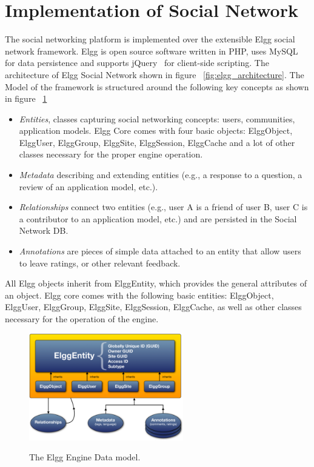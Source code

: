 \section{Implementation of Social Network}
\label{sec:implementaion_of_social_netowrk}
The social networking platform is implemented over the extensible Elgg social network framework\cite{elgg_url}.  Elgg is open source software written in PHP, uses MySQL for data persistence and supports jQuery~\cite{jquery_url} for client-side scripting.  The architecture of Elgg Social Network shown in figure ~\ref{fig:elgg_architecture}. The Model of the framework is structured around the following key concepts as shown in figure ~\ref{fig:elgg_entities}
\begin{itemize}
\item \emph{Entities}, classes capturing social networking concepts: users, communities, application models. Elgg Core comes with four basic objects: ElggObject, ElggUser, ElggGroup, ElggSite, ElggSession, ElggCache and a lot of other classes necessary for the proper engine operation.
\item \emph{Metadata} describing and extending entities (e.g., a response to a question, a review of an application model, etc.).
\item  \emph{Relationships} connect two entities (e.g., user A is a friend of user B, user C is a contributor to an application model, etc.) and are persisted in the Social Network DB.
\item \emph{Annotations} are pieces of simple data attached to an entity that allow users to leave ratings, or other relevant feedback.
\end{itemize}
All Elgg objects inherit from ElggEntity, which provides the general attributes of an object. Elgg core comes with the following basic entities: ElggObject, ElggUser, ElggGroup, ElggSite, ElggSession, ElggCache, as well as other classes necessary for the operation of the engine.

\begin{figure}[h]
	\caption{The Elgg Engine Data model.}
	\includegraphics[width=0.6\textwidth,natwidth=200,natheight=150]{./fig/elgg_data_model.png}
	\centering
	\label{fig:elgg_entities}
\end{figure}


